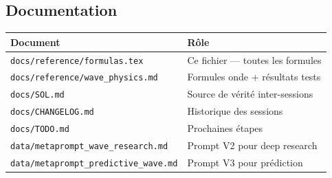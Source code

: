 \documentclass[11pt,a4paper]{article}
\begin{document}
\subsection{Documentation}

\begin{center}
\begin{tabular}{ll}
\toprule
\textbf{Document} & \textbf{R\^ole} \\
\midrule
\texttt{docs/reference/formulas.tex} & Ce fichier --- toutes les formules \\
\texttt{docs/reference/wave\_physics.md} & Formules onde + r\'esultats tests \\
\texttt{docs/SOL.md} & Source de v\'erit\'e inter-sessions \\
\texttt{docs/CHANGELOG.md} & Historique des sessions \\
\texttt{docs/TODO.md} & Prochaines \'etapes \\
\texttt{data/metaprompt\_wave\_research.md} & Prompt V2 pour deep research \\
\texttt{data/metaprompt\_predictive\_wave.md} & Prompt V3 pour pr\'ediction \\
\bottomrule
\end{tabular}
\end{center}
\end{document}
